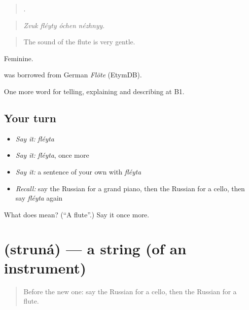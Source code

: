 \begin{quote}
   .
\end{quote}

\begin{quote}
\emph{Zvuk fléyty óchen nézhnyy.}
\end{quote}

\begin{quote}
The sound of the flute is very gentle.
\end{quote}

Feminine.

\begin{cousinweb}
\emph{} was borrowed from German \emph{Flöte} (EtymDB).
\end{cousinweb}

\begin{grammarlens}[title={What you've built}]
One more word for telling, explaining and describing at B1.
\end{grammarlens}

\subsection*{Your turn}
\begin{itemize}
\raggedright
  \item \emph{Say it:} \emph{fléyta}
  \item \emph{Say it:} \emph{fléyta}, once more
  \item \emph{Say it:} a sentence of your own with \emph{fléyta}
  \item \emph{Recall:} say the Russian for a grand piano, then the Russian for a cello, then say \emph{fléyta} again
\end{itemize}

\begin{tcolorbox}[breakable,colback=teal!4,colframe=teal!35!black,title={Before you move on}]
What does  mean? (\textquotedblleft{}A flute\textquotedblright{}.) Say it once more.
\end{tcolorbox}
\section[\texorpdfstring{\ru{струна} (struná)}{струна (struná)}]{ (struná) — a string (of an instrument)}

\label{lesson:RU-C515-struna}



\begin{quote}
Before the new one: say the Russian for a cello, then the Russian for a flute.
\end{quote}

